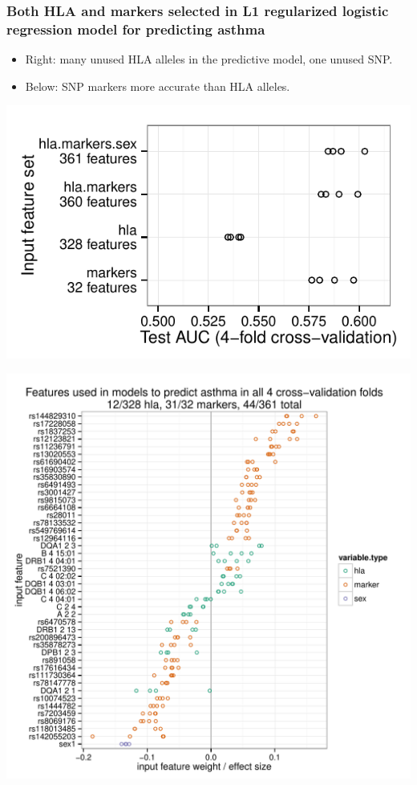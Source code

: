 \documentclass{beamer}
\begin{document}
\begin{frame}
  \frametitle{Both HLA and markers selected in L1 regularized logistic regression
    model for predicting asthma }

  \begin{minipage}{0.39\linewidth}
    \begin{itemize}
    \item Right: many unused HLA alleles in the predictive model, one
      unused SNP.
    \item Below: SNP markers more accurate than HLA alleles.
    \end{itemize}
  \includegraphics[width=\textwidth]{figure-asthma-old}
  \end{minipage}
  \begin{minipage}{0.59\linewidth}
    \includegraphics[width=\textwidth]{figure-asthma-4folds}
  \end{minipage}
\end{frame}
 
\end{document}
